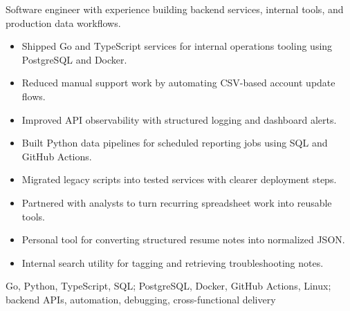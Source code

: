 \documentclass{common/resume}
\begin{document}

Software engineer with experience building backend services, internal tools, and production data workflows.

\begin{itemize}
  \item Shipped Go and TypeScript services for internal operations tooling using PostgreSQL and Docker.
  \item Reduced manual support work by automating CSV-based account update flows.
  \item Improved API observability with structured logging and dashboard alerts.
\end{itemize}

\begin{itemize}
  \item Built Python data pipelines for scheduled reporting jobs using SQL and GitHub Actions.
  \item Migrated legacy scripts into tested services with clearer deployment steps.
  \item Partnered with analysts to turn recurring spreadsheet work into reusable tools.
\end{itemize}

\begin{itemize}
  \item Personal tool for converting structured resume notes into normalized JSON.
\end{itemize}

\begin{itemize}
  \item Internal search utility for tagging and retrieving troubleshooting notes.
\end{itemize}

Go, Python, TypeScript, SQL; PostgreSQL, Docker, GitHub Actions, Linux; backend APIs, automation, debugging, cross-functional delivery
\end{document}
